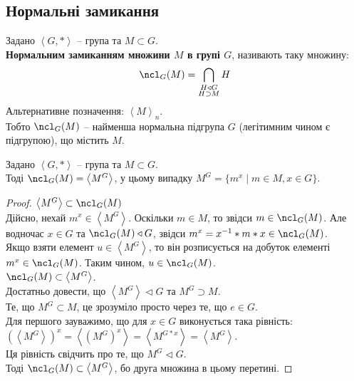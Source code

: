 \documentclass{math_library}
\begin{document}
\subsection{Нормальні замикання}
\begin{definition}
Задано $\left< G, *\right>$ -- група та $M \subset G$.\\
\textbf{Нормальним замиканням множини $M$ в групі $G$}, називають таку множину:
\begin{align*}
\ncl_G(M) = \bigcap_{\substack{H \triangleleft G \\ H \supset M}} H
\end{align*}
Альтернативне позначення: $\left< M \right>_n$.\\
Тобто $\ncl_G(M)$ -- найменша нормальна підгрупа $G$ (легітимним чином є підгрупою), що містить $M$.
\end{definition}

\begin{theorem}
Задано $\left<G,*\right>$ -- група та $M \subset G$.\\
Тоді $\ncl_G(M) = \left< M^G \right>$, у цьому випадку $M^G = \{m^x \mid m \in M,x \in G\}$.
\end{theorem}

\begin{proof}
$\left<M^G \right> \subset \ncl_G(M)$\\
Дійсно, нехай $m^x \in \left<M^G\right>$. Оскільки $m \in M$, то звідси $m \in \ncl_G(M)$. Але водночас $x \in G$ та $\ncl_G(M) \triangleleft G$, звідси $m^x = x^{-1}*m*x \in \ncl_G(M)$.\\
Якщо взяти елемент $u \in \left< M^G \right>$, то він розписується на добуток елементі $m^x \in \ncl_G(M)$. Таким чином, $u \in \ncl_G(M)$.
\bigskip \\
$\ncl_G(M) \subset \left< M^G \right>$.\\
Достатньо довести, що $\left< M^G \right> \triangleleft G$ та $M^G \supset M$.\\
Те, що $M^G \subset M$, це зрозуміло просто через те, що $e \in G$.\\
Для першого зауважимо, що для $x \in G$ виконується така рівність:\\
$\left(\left< M^G \right>\right)^x = \left< (M^{G})^x \right> = \left< M^{G*x} \right> = \left< M^G \right>$.\\
Ця рівність свідчить про те, що $M^G \triangleleft G$.\\
Тоді $\ncl_G(M) \subset \left<M^G\right>$, бо друга множина в цьому перетині.
\end{proof}
\end{document}
